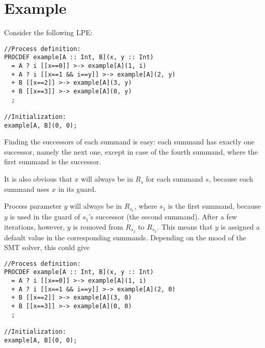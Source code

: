 \clearpage
\section{Example}

Consider the following LPE:

\begin{lstlisting}
//Process definition:
PROCDEF example[A :: Int, B](x, y :: Int)
  = A ? i [[x==0]] >-> example[A](1, i)
  + A ? i [[x==1 && i==y]] >-> example[A](2, y)
  + B [[x==2]] >-> example[A](3, y)
  + B [[x==3]] >-> example[A](0, y)
  ;

//Initialization:
example[A, B](0, 0);
\end{lstlisting}

Finding the successors of each summand is easy: each summand has exactly one successor, namely the next one, except in case of the fourth summand, where the first summand is the successor.

It is also obvious that $x$ will always be in $R_s$ for each summand $s$, because each summand uses $x$ in its guard.

Process parameter $y$ will always be in $R_{s_1}$, where $s_1$ is the first summand, because $y$ is used in the guard of $s_1$'s successor (the second summand).
After a few iterations, however, $y$ is removed from $R_{s_2}$ to $R_{s_4}$.
This means that $y$ is assigned a default value in the corresponding summands.
Depending on the mood of the SMT solver, this could give

\begin{lstlisting}
//Process definition:
PROCDEF example[A :: Int, B](x, y :: Int)
  = A ? i [[x==0]] >-> example[A](1, i)
  + A ? i [[x==1 && i==y]] >-> example[A](2, 0)
  + B [[x==2]] >-> example[A](3, 0)
  + B [[x==3]] >-> example[A](0, 0)
  ;

//Initialization:
example[A, B](0, 0);
\end{lstlisting}




